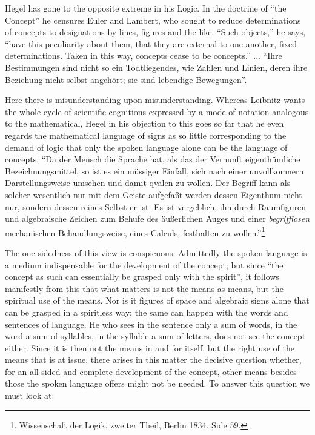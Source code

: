 \documentclass[12pt,a4paper,openany]{book}
\newcommand{\opage}[1]{\marginnote{\footnotesize\textit{[#1]}}}
\begin{document}
Hegel has gone to the opposite extreme in his Logic.
In the doctrine of ``the Concept'' he censures Euler and Lambert, who
sought to reduce determinations of concepts to designations by
lines, figures and the like. ``Such objects,'' he says,
``have this peculiarity about them, that they are external to
one another, fixed determinations. Taken in this way, concepts
cease to be concepts.'' ... ``Ihre Bestimmungen
sind nicht so ein Todtliegendes, wie Zahlen und Linien, deren
ihre Beziehung nicht selbst angehört; sie sind lebendige Bewegungen''.

Here there is misunderstanding upon misunderstanding. Whereas
Leibnitz wants the whole cycle of scientific cognitions
expressed by a mode of notation analogous to the mathematical,
Hegel in his objection to this goes so far
that he even regards the mathematical language of signs as so
little corresponding to the demand of logic that only the spoken language
alone can be the language of concepts. ``Da der Mensch die
\setcounter{footnote}{0}%
\opage{23}Sprache hat, als das der Vernunft eigenthümliche Bezeichnungsmittel,
so ist es ein müssiger Einfall, sich nach einer unvollkomnern
Darstellungsweise umsehen und damit qvälen zu
wollen. Der Begriff kann als solcher wesentlich nur mit
dem Geiste aufgefaßt werden dessen Eigenthum nicht nur,
sondern dessen reines Selbst er ist. Es ist vergeblich, ihn
durch Raumfiguren und algebraische Zeichen zum Behufe
des äußerlichen Auges und einer \emph{begrifflosen} mechanischen
Behandlungsweise, eines Calculs, festhalten
zu wollen.''\footnote[1]{Wissenschaft der Logik, zweiter Theil, Berlin 1834. Side 59.}

The one-sidedness of this view is conspicuous.
Admittedly the spoken language is a medium indispensable for the development of the concept;
but since ``the concept as such can essentially be
grasped only with the spirit'', it follows manifestly from this
that what matters is not the means as means, but the spiritual
use of the means. Nor is it
figures of space and algebraic signs alone that can be grasped
in a spiritless way; the same can happen with the
words and sentences of language. He who sees in the sentence only a
sum of words, in the word a sum of syllables, in the syllable
a sum of letters, does not see the concept either. Since it
is then not the means in and for itself, but the right use
of the means that is at issue, there arises in this
matter the decisive question whether, for an all-sided and complete
development of the concept, other means besides those the spoken language
offers might not be needed. To answer
this question we must look at:
\end{document}

